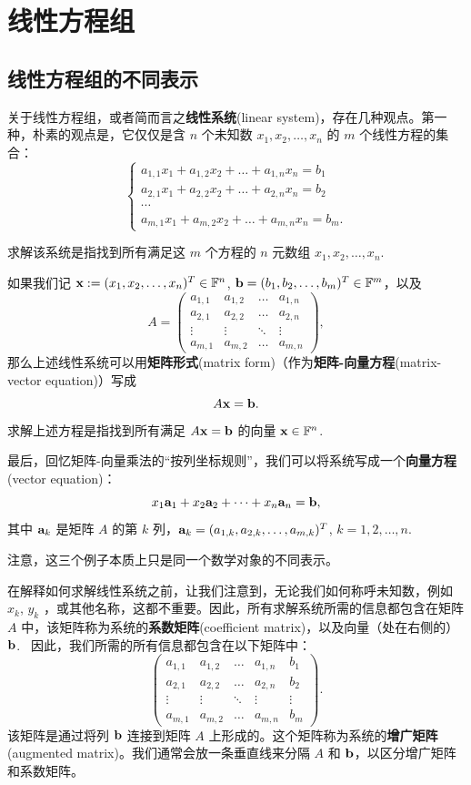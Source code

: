 
\chapter{线性方程组}\label{chap:02}

\section{线性方程组的不同表示}\label{sec:02-01}

关于线性方程组，或者简而言之\textbf{线性系统}(linear system)，存在几种观点。第一种，朴素的观点是，它仅仅是含 $n$ 个未知数 $x_1, x_2, \dots, x_n$ 的 $m$ 个线性方程的集合：
$$
\begin{cases}
a_{1,1} x_1 + a_{1,2} x_2 + \dots + a_{1,n} x_n = b_1 \\
a_{2,1} x_1 + a_{2,2} x_2 + \dots + a_{2,n} x_n = b_2 \\
\cdots \\
a_{m,1} x_1 + a_{m,2} x_2 + \dots + a_{m,n} x_n = b_m.
\end{cases}
$$

求解该系统是指找到所有满足这 $m$ 个方程的 $n$ 元数组 $x_1, x_2, \dots, x_n$. ~

如果我们记 $\mathbf{x} := (x_1, x_2, \dots, x_n)^T \in \mathbb{F}^n$, $\mathbf{b} = (b_1, b_2, \dots, b_m)^T \in \mathbb{F}^m$，以及
$$
A = \begin{pmatrix}
a_{1,1} & a_{1,2} & \dots & a_{1,n} \\
a_{2,1} & a_{2,2} & \dots & a_{2,n} \\
\vdots & \vdots & \ddots & \vdots \\
a_{m,1} & a_{m,2} & \dots & a_{m,n}
\end{pmatrix},
$$
那么上述线性系统可以用\textbf{矩阵形式}(matrix form)（作为\textbf{矩阵-向量方程}(matrix-vector equation)）写成
$$A \mathbf{x} = \mathbf{b}.$$
求解上述方程是指找到所有满足 $A \mathbf{x} = \mathbf{b}$ 的向量 $\mathbf{x} \in \mathbb{F}^n$. ~

最后，回忆矩阵-向量乘法的“按列坐标规则”，我们可以将系统写成一个\textbf{向量方程}(vector equation)：
$$
x_1 \mathbf{a}_1 + x_2 \mathbf{a}_2 + \dots + x_n \mathbf{a}_n = \mathbf{b},
$$
其中 $\mathbf{a}_k$ 是矩阵 $A$ 的第 $k$ 列，$\mathbf{a}_k = (a_{1,k}, a_{2,k}, \dots, a_{m,k})^T$, $k = 1, 2, \dots, n$. ~

注意，这三个例子本质上只是同一个数学对象的不同表示。

在解释如何求解线性系统之前，让我们注意到，无论我们如何称呼未知数，例如 $x_k$, $y_k$ ，或其他名称，这都不重要。因此，所有求解系统所需的信息都包含在矩阵 $A$ 中，该矩阵称为系统的\textbf{系数矩阵}(coefficient matrix)，以及向量（处在右侧的）$\mathbf{b}$. ~因此，我们所需的所有信息都包含在以下矩阵中：
$$
\left(\begin{array}{cccc|c}
a_{1,1} & a_{1,2} & \dots & a_{1,n} & b_1 \\
a_{2,1} & a_{2,2} & \dots & a_{2,n} & b_2 \\
\vdots & \vdots & \ddots & \vdots & \vdots \\
a_{m,1} & a_{m,2} & \dots & a_{m,n} & b_m
\end{array}\right).
$$
该矩阵是通过将列 $\mathbf{b}$ 连接到矩阵 $A$ 上形成的。这个矩阵称为系统的\textbf{增广矩阵}(augmented matrix)。我们通常会放一条垂直线来分隔 $A$ 和 $\mathbf{b}$，以区分增广矩阵和系数矩阵。


